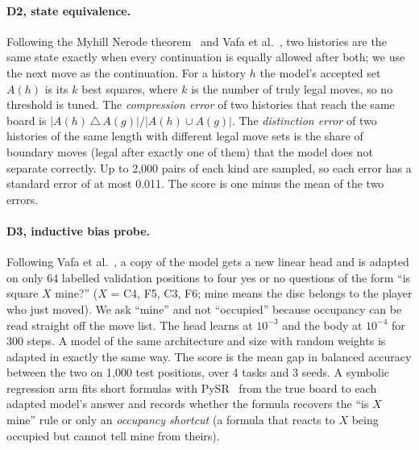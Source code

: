 \documentclass[11pt]{scrartcl}
\begin{document}
\paragraph{D2, state equivalence.} Following the Myhill Nerode theorem~\cite{nerode1958linear} and Vafa et
al.~\cite{vafa2024evaluating}, two histories are the same state exactly when every continuation is equally
allowed after both; we use the next move as the continuation. For a history $h$ the model's accepted set
$A(h)$ is its $k$ best squares, where $k$ is the number of truly legal moves, so no threshold is tuned. The
\emph{compression error} of two histories that reach the same board is
$|A(h)\,\triangle\,A(g)|/|A(h)\cup A(g)|$. The \emph{distinction error} of two histories of the same length
with different legal move sets is the share of boundary moves (legal after exactly one of them) that the model
does not separate correctly. Up to 2,000 pairs of each kind are sampled, so each error has a standard error of
at most 0.011. The score is one minus the mean of the two errors.

\paragraph{D3, inductive bias probe.} Following Vafa et al.~\cite{vafa2025inductive}, a copy of the model gets
a new linear head and is adapted on only 64 labelled validation positions to four yes or no questions of the
form ``is square $X$ mine?'' ($X$ = C4, F5, C3, F6; mine means the disc belongs to the player who just moved).
We ask ``mine'' and not ``occupied'' because occupancy can be read straight off the move list. The head
learns at $10^{-3}$ and the body at $10^{-4}$ for 300 steps. A model of the same architecture and size with
random weights is adapted in exactly the same way. The score is the mean gap in balanced accuracy between the
two on 1,000 test positions, over 4 tasks and 3 seeds. A symbolic regression arm fits short formulas with
PySR~\cite{cranmer2023pysr} from the true board to each adapted model's answer and records whether the formula
recovers the ``is $X$ mine'' rule or only an \emph{occupancy shortcut} (a formula that reacts to $X$ being
occupied but cannot tell mine from theirs).
\end{document}
